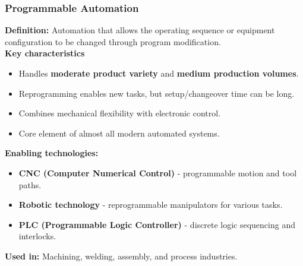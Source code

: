\begin{frame}
	\frametitle{Programmable Automation}
  \textbf{Definition:}  
  Automation that allows the operating sequence or equipment configuration to be changed through program modification.
  \vspace{2mm}\\
  \textbf{Key characteristics}
  \begin{itemize}
    \item Handles \textbf{moderate product variety} and \textbf{medium production volumes}.
    \item Reprogramming enables new tasks, but setup/changeover time can be long.
    \item Combines mechanical flexibility with electronic control.
    \item Core element of almost all modern automated systems.
  \end{itemize}
  \vspace{3mm}
  \textbf{Enabling technologies:}
  \begin{itemize}
    \item \textbf{CNC (Computer Numerical Control)} - programmable motion and tool paths.
    \item \textbf{Robotic technology} - reprogrammable manipulators for various tasks.
    \item \textbf{PLC (Programmable Logic Controller)} - discrete logic sequencing and interlocks.
  \end{itemize}
  \vspace{3mm}
  \textbf{Used in:} Machining, welding, assembly, and process industries.
\end{frame}

